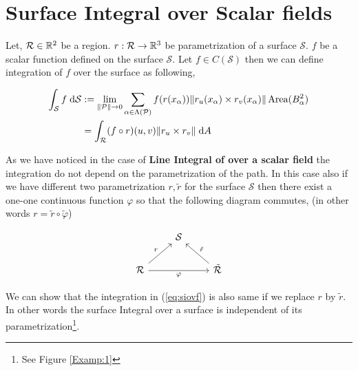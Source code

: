 \documentclass[../Analysis-3.tex]{subfiles}
\begin{document}
\section{Surface Integral over Scalar fields}

Let, $\mathcal{R} \in \mathbb{R}^2$ be a region. $r:\mathcal{R} \to \mathbb{R}^3$ be parametrization of a surface $\mathcal{S}$. $f$ be a scalar function defined on the surface $\mathcal{S}$. Let $f \in C(\mathcal{S})$ then we can define integration of $f$ over the surface as following,

\begin{align}
  \int_{\mathcal{S}} f \hspace{0.1cm} \dd \mathcal{S} & := \lim_{\norm{\mathcal{P}} \to 0} \sum_{\alpha \in \Lambda (\mathcal{P})} f(r(x_{\alpha})) \norm{r_u(x_{\alpha}) \times r_v(x_{\alpha})} \operatorname{Area}(B_{\alpha}^2) \nonumber \\
                                                      & = \int_{\mathcal{R}} (f \circ r)(u,v) \norm{r_u \times r_v} \hspace{0.1cm} \dd A \label{eq:siovf}
\end{align}

As we have noticed in the case of \textbf{Line Integral of over a scalar field} the integration do not depend on the parametrization of the path. In this case also if we have different two parametrization $r, \tilde{r}$ for the surface $\mathcal{S}$ then there exist a one-one continuous function $\varphi$ so that the following diagram commutes, (in other words $r = \tilde{r} \circ \tilde{\varphi}$)

\[\begin{tikzcd}
    & {\mathcal{S}} \\
    {\mathcal{R}} && {\tilde{\mathcal{R}}}
    \arrow["r", from=2-1, to=1-2]
    \arrow["{\tilde{r}}"', from=2-3, to=1-2]
    \arrow["\varphi"', from=2-1, to=2-3]
  \end{tikzcd}\]

We can show that the integration in (\ref{eq:siovf}) is also same if we replace $r$ by $\tilde{r}$. In other words the surface Integral over a surface is independent of its parametrization\footnote{See Figure \ref{Examp:1}}.
\end{document}
